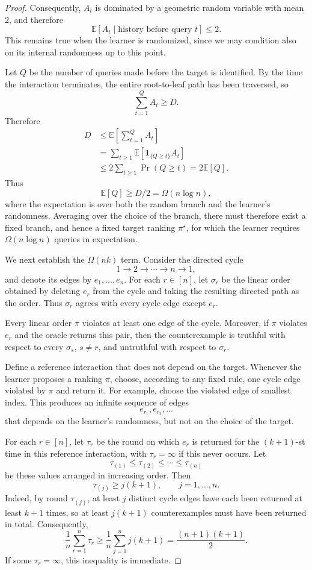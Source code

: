 \documentclass[10pt,a4paper]{amsart}
\begin{document}
\begin{proof}
Consequently, $A_t$ is dominated by a geometric random variable with mean
$2$, and therefore
\[
    \mathbb E[A_t\mid\text{history before query }t]\leq 2.
\]
This remains true when the learner is randomized, since we may condition
also on its internal randomness up to this point.

Let $Q$ be the number of queries made before the target is identified. By
the time the interaction terminates, the entire root-to-leaf path has been
traversed, so
\[
    \sum_{t=1}^{Q} A_t\geq D.
\]
Therefore
\begin{align*}
    D
    &\leq
    \mathbb E\left[\sum_{t=1}^{Q}A_t\right] \\
    &=
    \sum_{t\geq1}
    \mathbb E\left[
        \mathbf 1_{\{Q\geq t\}}A_t
    \right] \\
    &\leq
    2\sum_{t\geq1}\Pr(Q\geq t)
    =
    2\mathbb E[Q].
\end{align*}
Thus
\[
    \mathbb E[Q]\geq D/2=\Omega(n\log n),
\]
where the expectation is over both the random branch and the learner's
randomness. Averaging over the choice of the branch, there must therefore
exist a fixed branch, and hence a fixed target ranking $\pi^\star$, for
which the learner requires $\Omega(n\log n)$ queries in expectation.

We next establish the $\Omega(nk)$ term. Consider the directed cycle
\[
    1\to2\to\cdots\to n\to1,
\]
and denote its edges by $e_1,\ldots,e_n$. For each $r\in[n]$, let
$\sigma_r$ be the linear order obtained by deleting $e_r$ from the cycle
and taking the resulting directed path as the order. Thus $\sigma_r$ agrees
with every cycle edge except $e_r$.

Every linear order $\pi$ violates at least one edge of the cycle. Moreover,
if $\pi$ violates $e_r$ and the oracle returns this pair, then the
counterexample is truthful with respect to every $\sigma_s$, $s\neq r$,
and untruthful with respect to $\sigma_r$.

Define a reference interaction that does not depend on the target. Whenever
the learner proposes a ranking $\pi$, choose, according to any fixed rule,
one cycle edge violated by $\pi$ and return it. For example, choose the
violated edge of smallest index. This produces an infinite sequence of
edges
\[
    e_{r_1},e_{r_2},\ldots
\]
that depends on the learner's randomness, but not on the choice of the
target.

For each $r\in[n]$, let $\tau_r$ be the round on which $e_r$ is returned
for the $(k+1)$-st time in this reference interaction, with
$\tau_r=\infty$ if this never occurs. Let
\[
    \tau_{(1)}\leq\tau_{(2)}\leq\cdots\leq\tau_{(n)}
\]
be these values arranged in increasing order. Then
\[
    \tau_{(j)}\geq j(k+1),
    \qquad j=1,\ldots,n.
    \tag{21}\label{eq:cycle-hitting-times}
\]
Indeed, by round $\tau_{(j)}$, at least $j$ distinct cycle edges have each
been returned at least $k+1$ times, so at least $j(k+1)$ counterexamples
must have been returned in total. Consequently,
\[
    \frac1n\sum_{r=1}^n \tau_r
    \geq
    \frac1n\sum_{j=1}^n j(k+1)
    =
    \frac{(n+1)(k+1)}2.
    \tag{22}\label{eq:average-cycle-hitting-time}
\]
If some $\tau_r=\infty$, this inequality is immediate.


\end{proof}
\end{document}
